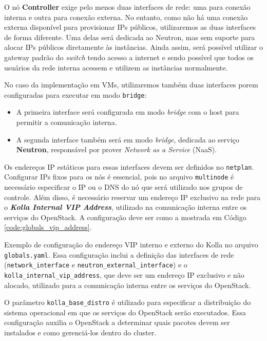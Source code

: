O nó \textbf{Controller} exige pelo menos duas interfaces de rede: uma para conexão interna e outra para conexão externa. No entanto, como não há uma conexão externa disponível para provisionar IPs públicos, utilizaremos as duas interfaces de forma diferente. Uma delas será dedicada ao Neutron, mas sem suporte para alocar IPs públicos diretamente às instâncias. Ainda assim, será possível utilizar o gateway padrão do \textit{switch} tendo acesso a internet e sendo possível que todos os usuários da rede interna acessem e utilizem as instâncias normalmente.

No caso da implementação em VMs, utilizaremos também duas interfaces porem configuradas para executar em modo \texttt{bridge}:
\begin{itemize}
    \item A primeira interface será configurada em modo \textit{bridge} com o host para permitir a comunicação interna.
    \item A segunda interface também será em modo \textit{bridge}, dedicada ao serviço \textbf{Neutron}, responsável por prover \textit{Network as a Service} (NaaS).
\end{itemize}

Os endereços IP estáticos para essas interfaces devem ser definidos no \texttt{netplan}. Configurar IPs fixos para os nós é essencial, pois no arquivo \texttt{multinode} é necessário especificar o IP ou o DNS do nó que será utilizado nos grupos de controle. Além disso, é necessário reservar um endereço IP exclusivo na rede para o \textbf{\textit{Kolla Internal VIP Address}}, utilizado na comunicação interna entre os serviços do OpenStack. A configuração deve ser como a mostrada em Código \ref{code:globals_vip_address}.

\begin{listing}[h!]
    \noindent{}  
  \caption{Exemplo de configuração do endereço VIP interno e externo do Kolla no arquivo \texttt{globals.yaml}. Essa configuração inclui a definição das interfaces de rede (\texttt{network\_interface} e \texttt{neutron\_external\_interface}) e o \texttt{kolla\_internal\_vip\_address}, que deve ser um endereço IP exclusivo e não alocado, utilizado para a comunicação interna entre os serviços do OpenStack.}
  \label{code:globals_vip_address}
\end{listing}

O parâmetro \texttt{kolla\_base\_distro} é utilizado para especificar a distribuição do sistema operacional em que os serviços do OpenStack serão executados. Essa configuração auxilia o OpenStack a determinar quais pacotes devem ser instalados e como gerenciá-los dentro do cluster.

